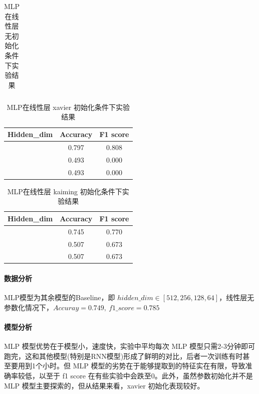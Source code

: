 \documentclass{article}
\begin{document}
\begin{spacing}{1.1}
\begin{table}[h]
\begin{tabular}{c|c|c}
				\end{tabular}
				\caption{MLP在线性层无初始化条件下实验结果}
			\end{table}
			
			\begin{table}[h]
				\center
				\begin{tabular}{c|c|c}
					\textbf{Hidden\_dim} & \textbf{Accuracy} & \textbf{F1 score} \\
					\hline
					[512,256,128,64] & 0.797 & 0.808 \\
					\hline
					[512,256,128,64,32]  & 0.493 & 0.000\\
					\hline
					[512,256,128,64,32,16] & 0.493 & 0.000 \\
					
				\end{tabular}
				\caption{MLP在线性层 xavier 初始化条件下实验结果}
			\end{table}
		
			\begin{table}[h]
				\center
				\begin{tabular}{c|c|c}
					\textbf{Hidden\_dim} & \textbf{Accuracy} & \textbf{F1 score} \\
					\hline
					[512,256,128,64] & 0.745 & 0.770 \\
					\hline
					[512,256,128,64,32]  & 0.507 & 0.673\\
					\hline
					[512,256,128,64,32,16] & 0.507 & 0.673 \\
					
				\end{tabular}
				\caption{MLP在线性层 kaiming 初始化条件下实验结果}
			\end{table}
		\paragraph*{数据分析}
			MLP模型为其余模型的Baseline，即 $hidden\_dim \in [512,256,128,64]$，线性层无参数化情况下，$Accuray = 0.749 ,\ f1\_score = 0.785$
		\paragraph*{模型分析}
			MLP 模型优势在于模型小，速度快，实验中平均每次 MLP 模型只需2-3分钟即可跑完，这和其他模型(特别是RNN模型)形成了鲜明的对比，后者一次训练有时甚至要用到1个小时。但 MLP 模型的劣势在于能够提取到的特征实在有限，导致准确率较低，以至于 f1 score 在有些实验中会跌至0。此外，虽然参数初始化并不是 MLP 模型主要探索的，但从结果来看，xavier 初始化表现较好。
			

\end{spacing}
\end{document}
